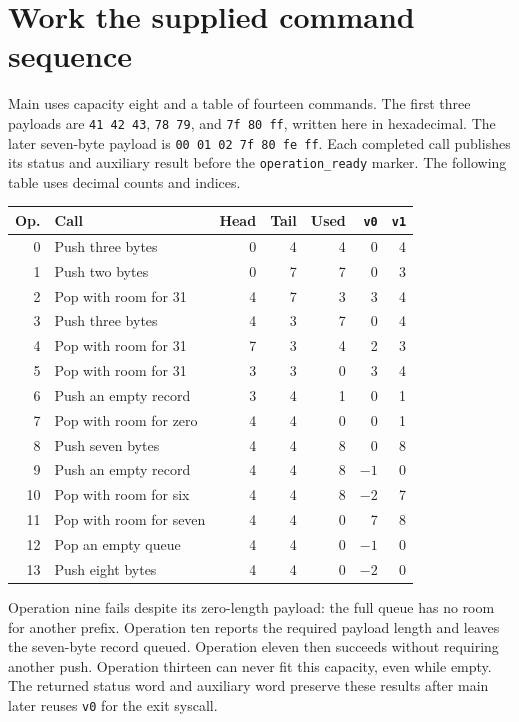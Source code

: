\section{Work the supplied command sequence}\label{ring-x-trace}
Main uses capacity eight and a table of fourteen commands. The first three payloads
are \texttt{41 42 43}, \texttt{78 79}, and \texttt{7f 80 ff}, written here in
hexadecimal. The later seven-byte payload is \texttt{00 01 02 7f 80 fe ff}.
Each completed call publishes its status and auxiliary result before the
\texttt{operation\_ready} marker. The following table uses decimal counts and indices.

\begin{longtable}{rlrrrrr}
  \toprule Op. & Call                    & Head & Tail & Used & \texttt{v0} & \texttt{v1} \\\midrule
  0            & Push three bytes        & 0    & 4    & 4    & 0           & 4           \\
  1            & Push two bytes          & 0    & 7    & 7    & 0           & 3           \\
  2            & Pop with room for 31    & 4    & 7    & 3    & 3           & 4           \\
  3            & Push three bytes        & 4    & 3    & 7    & 0           & 4           \\
  4            & Pop with room for 31    & 7    & 3    & 4    & 2           & 3           \\
  5            & Pop with room for 31    & 3    & 3    & 0    & 3           & 4           \\
  6            & Push an empty record    & 3    & 4    & 1    & 0           & 1           \\
  7            & Pop with room for zero  & 4    & 4    & 0    & 0           & 1           \\
  8            & Push seven bytes        & 4    & 4    & 8    & 0           & 8           \\
  9            & Push an empty record    & 4    & 4    & 8    & \(-1\)      & 0           \\
  10           & Pop with room for six   & 4    & 4    & 8    & \(-2\)      & 7           \\
  11           & Pop with room for seven & 4    & 4    & 0    & 7           & 8           \\
  12           & Pop an empty queue      & 4    & 4    & 0    & \(-1\)      & 0           \\
  13           & Push eight bytes        & 4    & 4    & 0    & \(-2\)      & 0           \\\bottomrule
\end{longtable}
Operation nine fails despite its zero-length payload: the full queue has no room
for another prefix. Operation ten reports the required payload length and leaves
the seven-byte record queued. Operation eleven then succeeds without requiring
another push. Operation thirteen can never fit this capacity, even while empty.
The returned status word and auxiliary word preserve these results after main later
reuses \texttt{v0} for the exit syscall.
